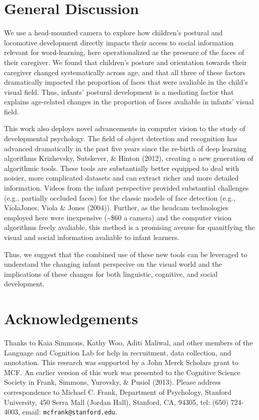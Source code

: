 \documentclass[10pt, letterpaper]{article}
\begin{document}
\section{General Discussion}\label{general-discussion}

We use a head-mounted camera to explore how children's postural and
locomotive development directly impacts their access to social
information relevant for word-learning, here operationalized as the
presence of the faces of their caregiver. We found that children's
posture and orientation towards their caregiver changed systematically
across age, and that all three of these factors dramatically impacted
the proportion of faces that were avaliable in the child's visual field.
Thus, infants' postural development is a mediating factor that explains
age-related changes in the proportion of faces avaliable in infants'
visual field.

This work also deploys novel advancements in computer vision to the
study of developmental psychology. The field of object detection and
recognition has advanced dramatically in the past five years since the
re-birth of deep learning algorithms Krizhevsky, Sutskever, \& Hinton
(2012), creating a new generation of algorithmic tools. These tools are
substantially better equipped to deal with noisier, more complicated
datasets and can extract richer and more detailed information. Videos
from the infant perspective provided substantial challenges (e.g.,
partially occluded faces) for the classic models of face detection
(e.g., ViolaJones, Viola \& Jones (2004)). Further, as the headcam
technologies employed here were inexpensive (\textasciitilde{}\$60 a
camera) and the computer vision algorithms freely avaliable, this method
is a promising avenue for quanitfying the visual and social information
avaliable to infant learners.

Thus, we suggest that the combined use of these new tools can be
leveraged to understand the changing infant perspecive on the visual
world and the implications of these changes for both linguistic,
cognitive, and social development.

\section{Acknowledgements}\label{acknowledgements}

Thanks to Kaia Simmons, Kathy Woo, Aditi Maliwal, and other members of
the Language and Cognition Lab for help in recruitment, data collection,
and annotation. This research was supported by a John Merck Scholars
grant to MCF. An earlier version of this work was presented to the
Cognitive Science Society in Frank, Simmons, Yurovsky, \& Pusiol (2013).
Please address correspondence to Michael C. Frank, Department of
Psychology, Stanford University, 450 Serra Mall (Jordan Hall), Stanford,
CA, 94305, tel: (650) 724-4003, email: \texttt{mcfrank@stanford.edu}.
\end{document}
